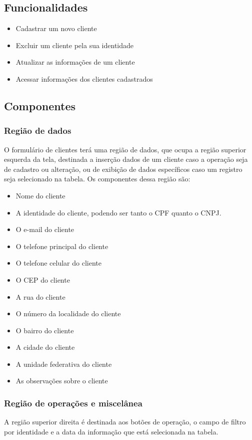 \documentclass[
	article,			%
	12pt,				%
	oneside,			%
	a4paper,			%
	english,			%
	brazil,				%
	sumario=tradicional
	]{abntex2}
\begin{document}
		\subsection{Funcionalidades}
			\begin{itemize}
				\item Cadastrar um novo cliente
				\item Excluir um cliente pela sua identidade
				\item Atualizar as informações de um cliente
				\item Acessar informações dos clientes cadastrados
			\end{itemize}	
		\subsection{Componentes}
			\subsubsection{Região de dados}
			O formulário de clientes terá uma região de dados, que ocupa a região superior esquerda da tela, destinada a inserção dados de um cliente caso a operação seja de cadastro ou alteração, ou de exibição de dados específicos caso um registro seja selecionado na tabela.
			Os componentes dessa região são:
				\begin{itemize}\itemsep1.5pt
					\item Nome do cliente
					\item A identidade do cliente, podendo ser tanto o CPF quanto o CNPJ.
					\item O e-mail do cliente
					\item O telefone principal do cliente
					\item O telefone celular do cliente
					\item O CEP do cliente
					\item A rua do cliente
					\item O número da localidade do cliente
					\item O bairro do cliente
					\item A cidade do cliente
					\item A unidade federativa do cliente
					\item As observações sobre o cliente
				\end{itemize}
			\subsubsection{Região de operações e miscelânea}
			A região superior direita é destinada aos botões de operação, o campo de filtro por identidade e a data da informação que está selecionada na tabela.
\end{document}
